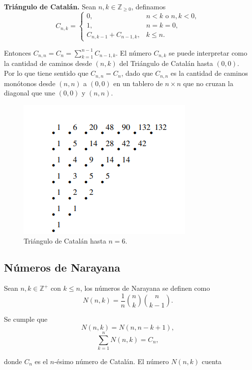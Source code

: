 \documentclass[12 pts,spanish,mexico]{article}
\numberwithin{equation}{section}
\newcommand{\Z}{\mathbb{Z}}
\begin{document}
\begin{multicols}{2}
\textbf{Triángulo de Catalán.} Sean $n, k \in \Z_{\geq 0}$, definamos
$$C_{n, k} = \begin{cases}
    0, &n < k \text{ o } n, k < 0,\\
    1, &n = k = 0,\\
    C_{n, k - 1} + C_{n - 1, k}, &k \leq n.
\end{cases}$$

Entonces $C_{n, n} = C_n = \sum_{k = 1}^{n - 1} C_{n - 1, k}$. El número $C_{n, k}$ se puede interpretar como la cantidad de caminos desde $(n, k)$ del Triángulo de Catalán hasta $(0, 0)$. Por lo que tiene sentido que $C_{n, n} = C_n$, dado que $C_{n, n}$ es la cantidad de caminos monótonos desde $(n, n)$ a $(0, 0)$ en un tablero de $n \times n$ que no cruzan la diagonal que une $(0, 0)$ y $(n, n)$.
\begin{figure}[H]
    \centering
    \includegraphics[width=0.5\linewidth]{img/triangulo_catalan.png}
    \caption{Triángulo de Catalán hasta $n = 6$.}
\end{figure}

\subsection{Números de Narayana}

Sean $n, k \in \Z^+$ con $k \leq n$, los números de Narayana se definen como
$$N(n, k) = \frac{1}{n}\binom{n}{k}\binom{n}{k - 1}.$$

Se cumple que
$$N(n, k) = N(n, n - k + 1),$$
$$\sum_{k = 1}^n N(n, k) = C_n,$$

donde $C_n$ es el $n$-ésimo número de Catalán. El número $N(n, k)$ cuenta


\end{multicols}
\end{document}
